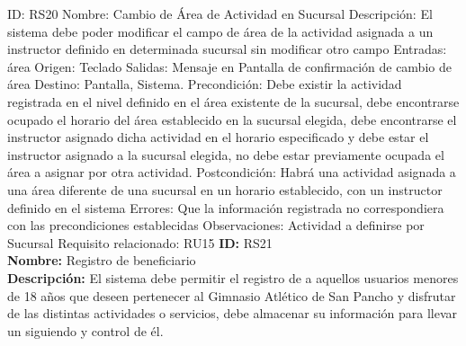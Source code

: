 ID: RS20
Nombre: Cambio de Área de Actividad en Sucursal
Descripción: El sistema debe poder modificar el campo de área de la actividad asignada a un instructor definido en determinada sucursal sin modificar otro campo
Entradas: área
Origen: Teclado
Salidas: Mensaje en Pantalla de confirmación de cambio de área
Destino: Pantalla, Sistema.
Precondición: Debe existir la actividad registrada en el nivel definido en el área existente de la sucursal, debe encontrarse ocupado el horario del área establecido en la sucursal elegida, debe encontrarse el instructor asignado dicha actividad en el horario especificado y debe estar el instructor asignado a la sucursal elegida, no debe estar previamente ocupada el área a asignar por otra actividad.
Postcondición: Habrá una actividad asignada a una área diferente de una sucursal en un horario establecido, con un instructor definido en el sistema
Errores: Que la información registrada no correspondiera con las precondiciones establecidas
Observaciones: Actividad a definirse por Sucursal
Requisito relacionado: RU15
\textbf{ID:} RS21\\
\textbf{Nombre:} Registro de beneficiario\\
\textbf{Descripción:} El sistema debe permitir el registro de a aquellos usuarios menores de 18 años que deseen pertenecer al Gimnasio Atlético de San Pancho y disfrutar de las distintas actividades o servicios, debe almacenar su información para llevar un siguiendo y control de él.\\

